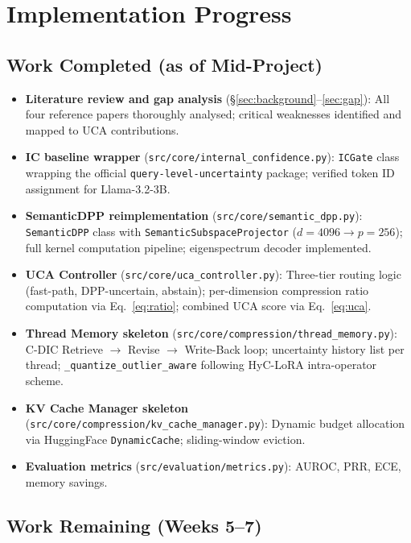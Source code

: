 \documentclass[11pt, a4paper]{article}
\begin{document}
\section{Implementation Progress}
\label{sec:progress}

\subsection{Work Completed (as of Mid-Project)}

\begin{itemize}[leftmargin=*, itemsep=3pt]
  \item \textbf{Literature review and gap analysis} (§\ref{sec:background}--\ref{sec:gap}): All four reference papers thoroughly analysed; critical weaknesses identified and mapped to UCA contributions.
  \item \textbf{IC baseline wrapper} (\texttt{src/core/internal\_confidence.py}): \texttt{ICGate} class wrapping the official \texttt{query-level-uncertainty} package; verified token ID assignment for Llama-3.2-3B.
  \item \textbf{SemanticDPP reimplementation} (\texttt{src/core/semantic\_dpp.py}): \texttt{SemanticDPP} class with \texttt{SemanticSubspaceProjector} ($d=4096\to p=256$); full kernel computation pipeline; eigenspectrum decoder implemented.
  \item \textbf{UCA Controller} (\texttt{src/core/uca\_controller.py}): Three-tier routing logic (fast-path, DPP-uncertain, abstain); per-dimension compression ratio computation via Eq.~\eqref{eq:ratio}; combined UCA score via Eq.~\eqref{eq:uca}.
  \item \textbf{Thread Memory skeleton} (\texttt{src/core/compression/thread\_memory.py}): C-DIC Retrieve $\to$ Revise $\to$ Write-Back loop; uncertainty history list per thread; \texttt{\_quantize\_outlier\_aware} following HyC-LoRA intra-operator scheme.
  \item \textbf{KV Cache Manager skeleton} (\texttt{src/core/compression/kv\_cache\_manager.py}): Dynamic budget allocation via HuggingFace \texttt{DynamicCache}; sliding-window eviction.
  \item \textbf{Evaluation metrics} (\texttt{src/evaluation/metrics.py}): AUROC, PRR, ECE, memory savings.
\end{itemize}

\subsection{Work Remaining (Weeks 5--7)}
\end{document}
